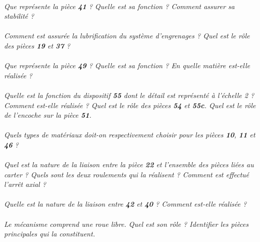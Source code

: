 \documentclass[11pt,oneside]{article}
\begin{document}
\paragraph{}
\textit{Que représente la pièce \textbf{41} ? Quelle est sa fonction ? Comment assurer sa stabilité ?}

\paragraph{}
\textit{Comment est assurée la lubrification du système d'engrenages ? Quel est le rôle des pièces \textbf{19} et \textbf{37} ?}

\paragraph{}
\textit{Que représente la pièce \textbf{49} ? Quelle est sa fonction ? En quelle matière est-elle réalisée ?}

\paragraph{}
\textit{Quelle est la fonction du dispositif \textbf{55} dont le détail est représenté à l'échelle 2 ? Comment est-elle réalisée ? Quel est le rôle des pièces \textbf{54} et \textbf{55c}. Quel est le rôle de l'encoche sur la pièce \textbf{51}.}

\paragraph{}
\textit{Quels types de matériaux doit-on respectivement choisir pour les pièces \textbf{10}, \textbf{11} et \textbf{46} ?}

\paragraph{}
\textit{Quel est la nature de la liaison entre la pièce \textbf{22} et l'ensemble des pièces liées au carter ? Quels sont les deux roulements qui la réalisent ? Comment est effectué l'arrêt axial ?}

\paragraph{}
\textit{Quelle est la nature de la liaison entre \textbf{42} et \textbf{40} ? Comment est-elle réalisée ?}

\paragraph{}
\textit{Le mécanisme comprend une roue libre. Quel est son rôle ? Identifier les pièces principales qui la constituent.}
\end{document}
